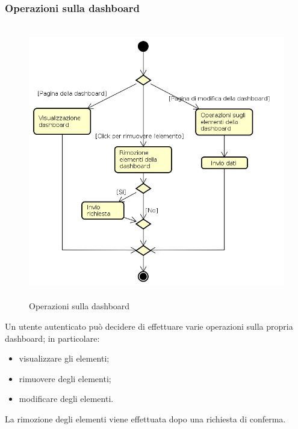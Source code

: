 \subsubsection{Operazioni sulla dashboard}
\begin{figure}[H]
\begin{center}
\includegraphics[height=12cm]{res/sections/backend/activities/operazioniDashboard.png}
\caption{Operazioni sulla dashboard}
\end{center}
\end{figure}
Un utente autenticato può decidere di effettuare varie operazioni sulla propria dashboard; in particolare:
\begin{itemize}
\item visualizzare gli elementi;
\item rimuovere degli elementi;
\item modificare degli elementi.
\end{itemize}
La rimozione degli elementi viene effettuata dopo una richiesta di conferma.
